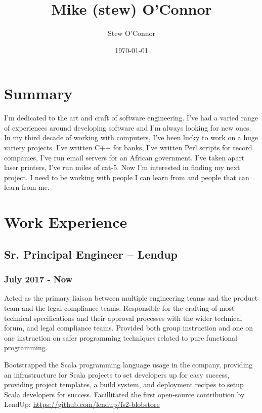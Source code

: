 \documentclass[letterpaper]{article}
\author{Stew O'Connor}
\date{\today}
\title{Mike (stew) O'Connor}
\begin{document}
\maketitle
{}

\section{Summary}
\label{sec-1}

I'm dedicated to the art and craft of software engineering. I've had a
varied range of experiences around developing software and I'm always
looking for new ones. In my third decade of working with computers,
I've been lucky to work on a huge variety projects. I've written C++
for banks, I've written Perl scripts for record companies, I've run
email servers for an African government. I've taken apart laser
printers, I've run miles of cat-5. Now I'm interested in finding my
next project. I need to be working with people I can learn from and
people that can learn from me.

\section{Work Experience}
\label{sec-2}
\subsection{Sr. Principal Engineer -- Lendup}
\label{sec-2-1}
\subsubsection{July 2017 - Now}
\label{sec-2-1-1}
\vspace{0.1in} 

Acted as the primary liaison between multiple engineering teams and
the product team and the legal compliance teams. Responsible for the
crafting of most technical specifications and their approval processes
with the wider technical forum, and legal compliance teams. Provided
both group instruction and one on one instruction on safer programming
techniques related to pure functional programming.
\vspace{0.1in}

Bootstrapped the Scala programming language usage in the company,
providing an infrastructure for Scala projects to set developers up
for easy success, providing project templates, a build system, and
deployment recipes to setup Scala developers for success. Facillitated
the first open-source contribution by LendUp: \url{https://github.com/lendup/fs2-blobstore}
\end{document}
